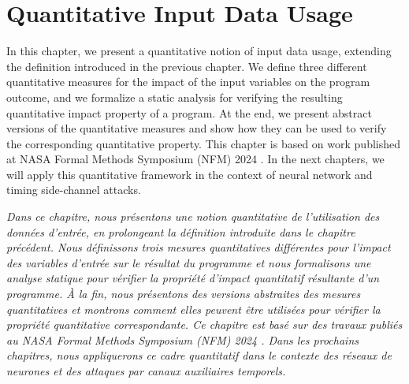 %

\chapter{Quantitative Input Data Usage}


In this chapter, we present a quantitative notion of input data usage, extending the definition introduced in the previous chapter.
We define three different quantitative measures for the impact of the input variables on the program outcome, and we formalize a static analysis for verifying the resulting quantitative impact property of a program.
At the end, we present abstract versions of the quantitative measures and show how they can be used to verify the corresponding quantitative property.
This chapter is based on work published at NASA Formal Methods Symposium (NFM) 2024 \cite{Mazzucato2024b}.
In the next chapters, we will apply this quantitative framework in the context of neural network and timing side-channel attacks.

\emph{Dans ce chapitre, nous présentons une notion quantitative de l'utilisation des données d'entrée, en prolongeant la définition introduite dans le chapitre précédent. Nous définissons trois mesures quantitatives différentes pour l'impact des variables d'entrée sur le résultat du programme et nous formalisons une analyse statique pour vérifier la propriété d'impact quantitatif résultante d'un programme. À la fin, nous présentons des versions abstraites des mesures quantitatives et montrons comment elles peuvent être utilisées pour vérifier la propriété quantitative correspondante. Ce chapitre est basé sur des travaux publiés au NASA Formal Methods Symposium (NFM) 2024 . Dans les prochains chapitres, nous appliquerons ce cadre quantitatif dans le contexte des réseaux de neurones et des attaques par canaux auxiliaires temporels.
}



% 
% 
% 
% 


